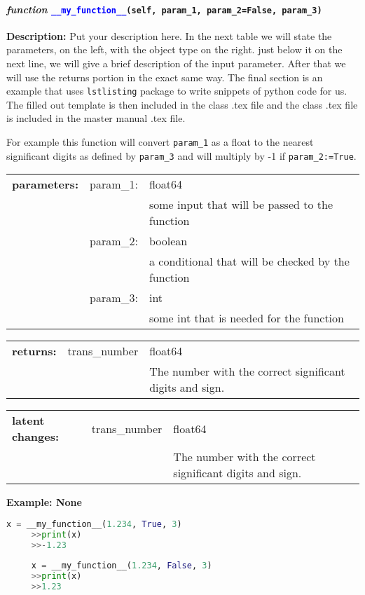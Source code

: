 


\paragraph{\textit{function} \textcolor{blue}{\texttt{\_\_my\_function\_\_}}\texttt{(self, param\_1, param\_2=False, param\_3)}}\hfill\break
\noindent \textbf{Description:} Put your description here. In the next table we will state the parameters, on the left, with the object type on the right. just below it on the next line, we will give a brief description of the input parameter. After that we will use the returns portion in the exact same way. The final section is an example that uses \texttt{lstlisting} package to write snippets of python code for us. The filled out template is then included in the class .tex file and the class .tex file is included in the master manual .tex file.

For example this function will convert \texttt{param\_1} as a float to the nearest significant digits as defined by \texttt{param\_3} and will multiply by -1 if \texttt{param\_2:=True}. 

\begin{tabular}{r r l }
	\textbf{parameters:}	& param\_1: & float64\\
	&  & some input that will be passed to the function\\
	& param\_2:& boolean\\
	&& a conditional that will be checked by the function\\
	& param\_3:& int\\
	&& some int that is needed for the function	
\end{tabular}

\begin{tabular}{l c l}
	\textbf{returns:} & trans\_number & float64\\
	& & The number with the correct significant digits and sign. 
\end{tabular}

\begin{tabular}{l c l}
	\textbf{latent changes:} & trans\_number & float64\\
	& & The number with the correct significant digits and sign. 
\end{tabular}

\textbf{Example: None}
	\begin{lstlisting}[language=Python]
	 x = __my_function__(1.234, True, 3)
	 >>print(x)
	 >>-1.23
	 
	 x = __my_function__(1.234, False, 3)
	 >>print(x)
	 >>1.23
	 \end{lstlisting}